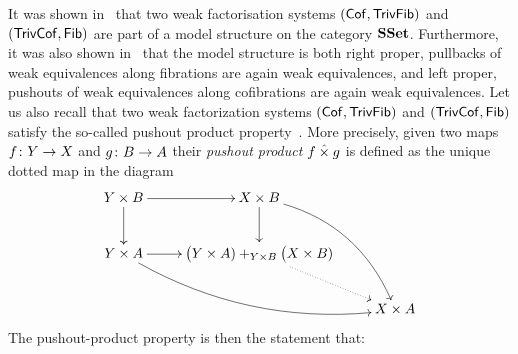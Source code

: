 \documentclass[reqno,10pt,a4paper,oneside,draft]{amsart}
\begin{document}
\medskip

It was shown in~\cite{henry2019qms} that two weak factorisation systems
$(\mathsf{Cof}, \mathsf{TrivFib})$ and $(\mathsf{TrivCof}, \mathsf{Fib})$ are part of a model structure on the category $\mathbf{SSet}$.
Furthermore, it was also shown in~\cite{henry2019qms} that the model structure is both 
right proper, \ie pullbacks of weak equivalences along fibrations are again weak equivalences, and
left proper, \ie pushouts of weak equivalences along cofibrations are again weak equivalences.
Let us also recall that
two weak factorization systems $(\mathsf{Cof}, \mathsf{TrivFib})$ and $(\mathsf{TrivCof}, \mathsf{Fib})$
satisfy the so-called pushout product property~\cite{henry2018wms}. More precisely, given two maps $f \colon Y \rightarrow X$ and $g \colon B \rightarrow A$ their \emph{pushout product} $f \mathbin{\hat{\times}} g$ is defined as the unique dotted map in the diagram
\[
\xymatrix{
Y \times B \ar[r] \ar[d] &  X \times B \ar[d] \ar@/^1.5pc/[ddr] \\
Y \times A \ar[r]  \ar@/_1.5pc/[drr] & \displaystyle \big( Y \times A ) +_{Y \times B} \big( X \times B ) \ar@{.>}[dr]  \\
 & & X \times A }
 \]
The pushout-product property is then the statement that:
\end{document}
